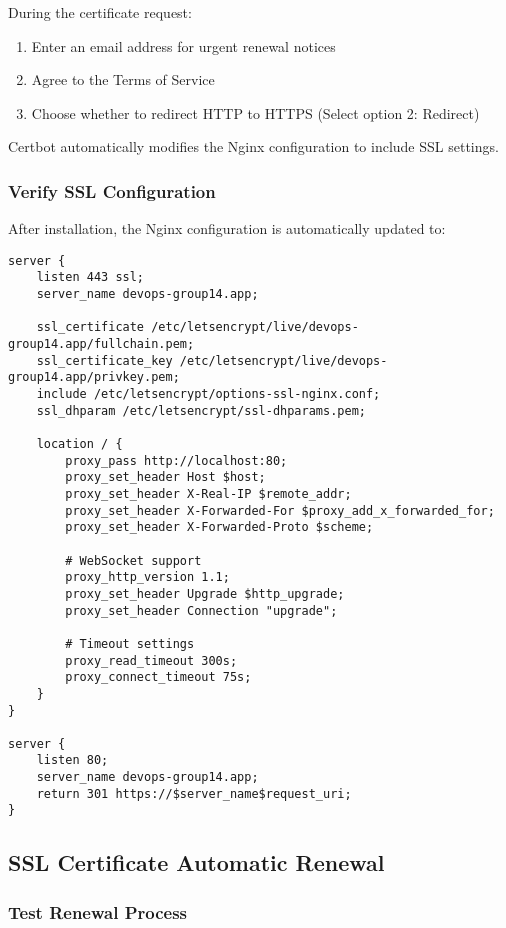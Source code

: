 During the certificate request:
\begin{enumerate}
    \item Enter an email address for urgent renewal notices
    \item Agree to the Terms of Service
    \item Choose whether to redirect HTTP to HTTPS (Select option 2: Redirect)
\end{enumerate}

Certbot automatically modifies the Nginx configuration to include SSL settings.

\subsubsection{Verify SSL Configuration}

After installation, the Nginx configuration is automatically updated to:

\begin{verbatim}
server {
    listen 443 ssl;
    server_name devops-group14.app;

    ssl_certificate /etc/letsencrypt/live/devops-group14.app/fullchain.pem;
    ssl_certificate_key /etc/letsencrypt/live/devops-group14.app/privkey.pem;
    include /etc/letsencrypt/options-ssl-nginx.conf;
    ssl_dhparam /etc/letsencrypt/ssl-dhparams.pem;

    location / {
        proxy_pass http://localhost:80;
        proxy_set_header Host $host;
        proxy_set_header X-Real-IP $remote_addr;
        proxy_set_header X-Forwarded-For $proxy_add_x_forwarded_for;
        proxy_set_header X-Forwarded-Proto $scheme;
        
        # WebSocket support
        proxy_http_version 1.1;
        proxy_set_header Upgrade $http_upgrade;
        proxy_set_header Connection "upgrade";
        
        # Timeout settings
        proxy_read_timeout 300s;
        proxy_connect_timeout 75s;
    }
}

server {
    listen 80;
    server_name devops-group14.app;
    return 301 https://$server_name$request_uri;
}
\end{verbatim}

\subsection{SSL Certificate Automatic Renewal}

\subsubsection{Test Renewal Process}

